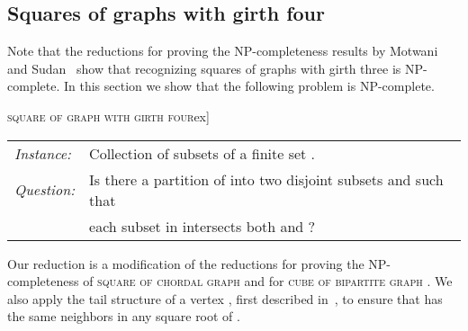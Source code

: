 \documentclass[proceedings]{stacs}
\newlength{\ai}
\begin{document}
\begin{center}
\section{Squares of graphs with girth four}\label{sec:girth3&4}
Note that the reductions for proving the NP-completeness results by Motwani and Sudan~\cite{MotSud1994} show that recognizing squares of graphs with
girth three is NP-complete.
In this section we show that the following problem is NP-complete.

\textsc{square of graph with girth four}\1ex]
\begin{tabular}{l l}
{\em Instance:}& Collection  of subsets of a finite set .\\
{\em Question:}& Is there a partition of  into two disjoint subsets  and  such that\\
               & each subset in  intersects both  and ?\\
\end{tabular}

Our reduction is a modification of the reductions
for proving the NP-completeness of \textsc{square of chordal graph} \cite[Theorem 3.5]{LauCor2004}
and for \textsc{cube of bipartite graph} \cite[Theorem 7.6]{Lau2006}.
We also apply the tail structure of a vertex , first described in~\cite{MotSud1994},
to ensure that  has the same neighbors in any square root  of .


\end{center}
\end{document}
